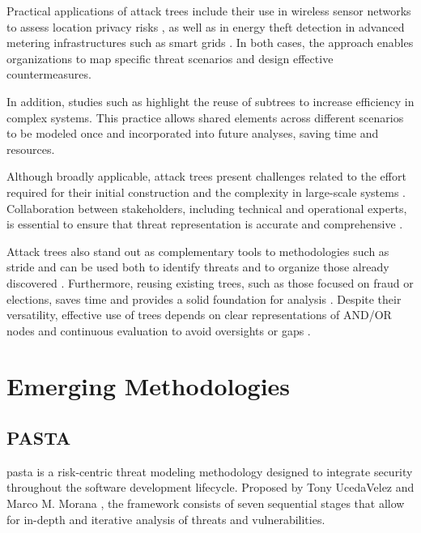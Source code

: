 Practical applications of attack trees include their use in wireless sensor
networks to assess location privacy risks \cite{AnAttackTreeBasedRisk}, as well
as in energy theft detection in advanced metering infrastructures such as smart
grids \cite{Energytheftdetectionissues}. In both cases, the approach enables
organizations to map specific threat scenarios and design effective
countermeasures.

In addition, studies such as \cite{FoundationsofAttackTrees} highlight the reuse
of subtrees to increase efficiency in complex systems. This practice allows
shared elements across different scenarios to be modeled once and incorporated
into future analyses, saving time and resources.

Although broadly applicable, attack trees present challenges related to the
effort required for their initial construction and the complexity in large-scale
systems \cite{AttackTrees, Energytheftdetectionissues}. Collaboration between
stakeholders, including technical and operational experts, is essential to
ensure that threat representation is accurate and comprehensive
\cite{Energytheftdetectionissues}.

Attack trees also stand out as complementary tools to methodologies such as
\gls{stride} and can be used both to identify threats and to organize those
already discovered \cite{FoundationsofAttackTrees,
ThreatModelingASystematicLiteratureReview}. Furthermore, reusing existing trees,
such as those focused on fraud or elections, saves time and provides a solid
foundation for analysis \cite{FoundationsofAttackTrees}. Despite their
versatility, effective use of trees depends on clear representations of AND/OR
nodes and continuous evaluation to avoid oversights or gaps
\cite{ThreatModelingdesigningForSecurity}.

\section{Emerging Methodologies}
\label{sec:emerging_methodologies}

\subsection{PASTA}
\label{subsec:pasta}

\gls{pasta} is a risk-centric threat modeling methodology designed to integrate
security throughout the software development lifecycle. Proposed by Tony
UcedaVelez and Marco M. Morana \cite{RiskCentricThreatModeling}, the framework
consists of seven sequential stages that allow for in-depth and iterative
analysis of threats and vulnerabilities.

